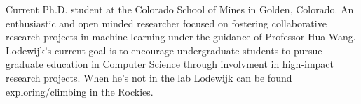 

\begin{cvparagraph}

Current Ph.D. student at the Colorado School of Mines in Golden, Colorado. An enthusiastic and open minded researcher focused on fostering collaborative research projects in machine learning under the guidance of Professor Hua Wang. Lodewijk's current goal is to encourage undergraduate students to pursue graduate education in Computer Science through involvment in high-impact research projects. When he's not in the lab Lodewijk can be found exploring/climbing in the Rockies. 
\end{cvparagraph}
